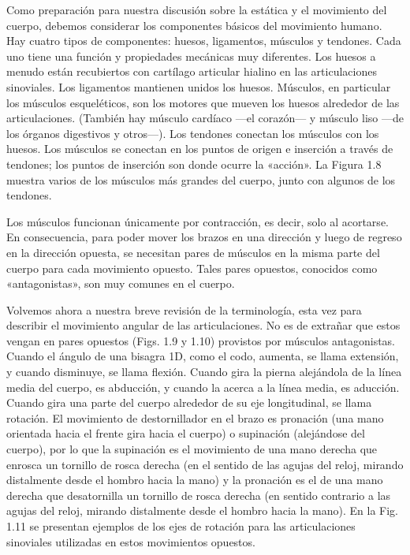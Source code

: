 \documentclass[12pt]{book}
\begin{document}
Como preparación para nuestra discusión sobre la estática y el movimiento del cuerpo, debemos considerar los componentes básicos del movimiento humano. Hay cuatro tipos de componentes: huesos, ligamentos, músculos y tendones. Cada uno tiene una función y propiedades mecánicas muy diferentes. Los huesos a menudo están recubiertos con cartílago articular hialino en las articulaciones sinoviales. Los ligamentos mantienen unidos los huesos. Músculos, en particular los músculos esqueléticos, son los motores que mueven los huesos alrededor de las articulaciones. (También hay músculo cardíaco ---el corazón--- y músculo liso ---de los órganos digestivos y otros---). Los tendones conectan los músculos con los huesos. Los músculos se conectan en los puntos de origen e inserción a través de tendones; los puntos de inserción son donde ocurre la «acción». La Figura 1.8 muestra varios de los músculos más grandes del cuerpo, junto con algunos de los tendones.

Los músculos funcionan únicamente por contracción, es decir, solo al acortarse. En consecuencia, para poder mover los brazos en una dirección y luego de regreso en la dirección opuesta, se necesitan pares de músculos en la misma parte del cuerpo para cada movimiento opuesto. Tales pares opuestos, conocidos como «antagonistas», son muy comunes en el cuerpo.

Volvemos ahora a nuestra breve revisión de la terminología, esta vez para describir el movimiento angular de las articulaciones. No es de extrañar que estos vengan en pares opuestos (Figs. 1.9 y 1.10) provistos por músculos antagonistas. Cuando el ángulo de una bisagra 1D, como el codo, aumenta, se llama extensión, y cuando disminuye, se llama flexión. Cuando gira la pierna alejándola de la línea media del cuerpo, es abducción, y cuando la acerca a la línea media, es aducción. Cuando gira una parte del cuerpo alrededor de su eje longitudinal, se llama rotación. El movimiento de destornillador en el brazo es pronación (una mano orientada hacia el frente gira hacia el cuerpo) o supinación (alejándose del cuerpo), por lo que la supinación es el movimiento de una mano derecha que enrosca un tornillo de rosca derecha (en el sentido de las agujas del reloj, mirando distalmente desde el hombro hacia la mano) y la pronación es el de una mano derecha que desatornilla un tornillo de rosca derecha (en sentido contrario a las agujas del reloj, mirando distalmente desde el hombro hacia la mano). En la Fig. 1.11 se presentan ejemplos de los ejes de rotación para las articulaciones sinoviales utilizadas en estos movimientos opuestos.
\end{document}
